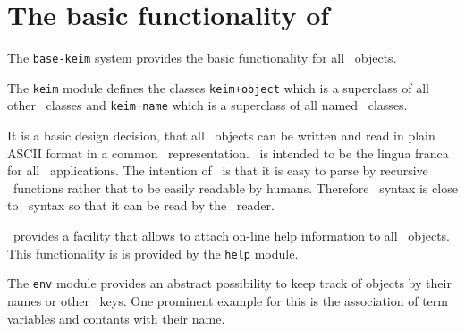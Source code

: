 \section{The basic functionality of \keim}

The {\tt base-keim} system provides the basic functionality 
for all \keim\ objects. 

The {\tt keim} module defines the classes {\tt keim+object} which is 
a superclass of all other \keim\ classes
and {\tt keim+name} which is a superclass of all named \keim\ classes.  

It is a basic design decision, that all \keim\ objects can be written and read in plain ASCII format in a
common \post\ representation. \post\ is intended to be the lingua 
franca for all \keim\ applications. The
intention of \post\ is that it is easy to parse by recursive \lisp\ functions rather that to be  easily
readable by humans. Therefore \post\ syntax is close to \lisp\ syntax so 
that it can be read by
the \lisp\ reader.

\keim\ provides a facility that allows to attach on-line help 
information to all \keim\ objects. This
functionality is is provided by the {\tt help} module.

The {\tt env} module provides an abstract possibility to keep track of 
objects by their names or other \lisp\
keys. One prominent example for this is the association of 
term variables and contants with their name.

